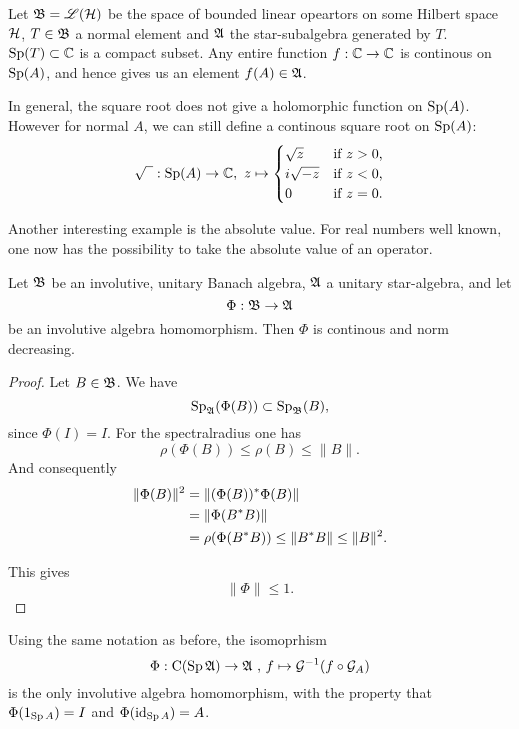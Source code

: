 \begin{expl}
 Let $\mathfrak{B} = \mathscr{L}(\mathcal{H})$ be the space of bounded linear opeartors on some Hilbert space $\mathcal{H}$, $T \in \mathfrak{B}$ a normal element and $\mathfrak{A}$ the star-subalgebra generated by $T$. $\operatorname{Sp} (T) \subset \mathbb{C}$ is a compact subset. Any entire function $f : \mathbb{C} \to \mathbb{C}$ is continous on $\operatorname{Sp} (A)$, and hence gives us an element $f(A) \in \mathfrak{A}$. 
 
 In general, the square root does not give a holomorphic function on $\operatorname{Sp} (A)$. However for normal $A$, we can still define a continous square root on $\operatorname{Sp} (A)$:
 \[
  \sqrt{\phantom{z}} : \operatorname{Sp} (A) \to \mathbb{C}, ~ z \mapsto 
  \begin{cases}
    \sqrt{z} 	& \text{if $z > 0$,} \\
    i \sqrt{-z}	& \text{if $ z < 0$,} \\
    0		& \text{if $ z = 0$.}
  \end{cases}
 \]

 Another interesting example is the absolute value. For real numbers well known, one now has the possibility to take the absolute value of an operator.
\end{expl}

\begin{prop}
 Let $\mathfrak{B}$ be an involutive, unitary Banach algebra, $\mathfrak{A}$ a unitary star-algebra, and let
\[
  \Phi : \mathfrak{B} \to \mathfrak{A} 
\]
be an involutive algebra homomorphism.
Then $\Phi$ is continous and norm decreasing.
\end{prop}
\begin{proof}
 Let $B \in \mathfrak{B}$. We have
\[
  \operatorname{Sp}_{\mathfrak{A}} (\Phi (B)) \subset \operatorname{Sp}_{\mathfrak{B}} (B),
\]
since $\Phi(I)=I$. For the spectralradius one has
\[
 \rho (\Phi (B)) \leq \rho ( B) \leq \| B \|.
\]
And consequently
\begin{align*}
 \| \Phi (B) \|^2 &= \| (\Phi (B))^{*} \Phi (B) \| \\
		  &= \| \Phi (B ^{*} B) \| \\
		  &= \rho ( \Phi(B ^{*} B)) \leq \| B^{*} B \| \leq \| B \| ^2.
\end{align*}

This gives 
\[
 \| \Phi \| \leq 1.
\]
\end{proof}
\begin{cor}
 Using the same notation as before, the isomoprhism
 \[
  \Phi : \operatorname{C} ( \operatorname{Sp} \mathfrak{A}) \to \mathfrak{A} \text{ , } f \mapsto \mathcal{G} ^{-1} (f \circ \mathcal{G}_A)
 \]
is the only involutive algebra homomorphism, with the property that \vspace{10 pt} $ \Phi ( 1_{\operatorname{Sp} A} ) =  I$  and $\Phi ( \operatorname{id} _{ \operatorname{Sp} A }) = A$.
 
\end{cor}

